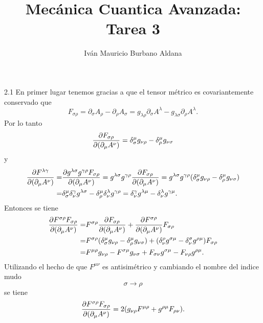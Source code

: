 \documentclass{article}
\title{Mecánica Cuantica Avanzada: Tarea 3}
\author{Iván Mauricio Burbano Aldana}
\begin{document}
\maketitle

2.1 En primer lugar tenemos gracias a que el tensor métrico es covariantemente conservado que
\begin{equation}
F_{\sigma\rho}=\partial_\sigma A_\rho-\partial_\rho A_\sigma=g_{\lambda\rho}\partial_\sigma A^{\lambda}-g_{\lambda\sigma} \partial_\rho A^{\lambda}.
\end{equation}
Por lo tanto
\begin{equation}
\pdv{F_{\sigma\rho}}{(\partial_\mu A^\nu)}=\delta^\mu_\sigma g_{\nu\rho}-\delta^\mu_\rho g_{\nu\sigma}
\end{equation}
y
\begin{align}
\begin{split}
\pdv{F^{\lambda\gamma}}{(\partial_\mu A^\nu)}=&\pdv{g^{\lambda\sigma}g^{\gamma\rho}F_{\sigma\rho}}{(\partial_\mu A^\nu)}=g^{\lambda\sigma}g^{\gamma\rho}\pdv{F_{\sigma\rho}}{(\partial_\mu A^\nu)}=g^{\lambda\sigma}g^{\gamma\rho}(\delta^\mu_\sigma g_{\nu\rho}-\delta^\mu_\rho g_{\nu\sigma})\\
=&\delta^\mu_\sigma\delta^\gamma_\nu g^{\lambda\sigma}-\delta^\mu_\rho\delta^\lambda_\nu g^{\gamma\rho}=\delta^\gamma_\nu g^{\lambda\mu}-\delta^\lambda_\nu g^{\gamma\mu}.
\end{split}
\end{align}
Entonces se tiene
\begin{align}
\begin{split}
\pdv{F^{\sigma\rho}F_{\sigma\rho}}{(\partial_\mu A^\nu)}=&F^{\sigma\rho}\pdv{F_{\sigma\rho}}{(\partial_\mu A^\nu)}+\pdv{F^{\sigma\rho}}{(\partial_\mu A^\nu)}F_{\sigma\rho}\\
=&F^{\sigma\rho}(\delta^\mu_\sigma g_{\nu\rho}-\delta^\mu_\rho g_{\nu\sigma})+(\delta^\rho_\nu g^{\sigma\mu}-\delta^\sigma_\nu g^{\rho\mu})F_{\sigma\rho}\\
=&F^{\mu\rho}g_{\nu\rho}-F^{\sigma\mu}g_{\nu\sigma}+F_{\sigma\nu}g^{\sigma\mu}-F_{\nu\rho}g^{\rho\mu}.
\end{split}
\end{align}
Utilizando el hecho de que $F^{\mu\nu}$ es antisimétrico y cambiando el nombre del indice mudo
\begin{equation}
\sigma\rightarrow\rho
\end{equation}
se tiene
\begin{equation}
\pdv{F^{\sigma\rho}F_{\sigma\rho}}{(\partial_\mu A^\nu)}=2(g_{\nu\rho}F^{\mu\rho}+g^{\rho\mu}F_{\rho\nu}).
\end{equation}
\end{document}
